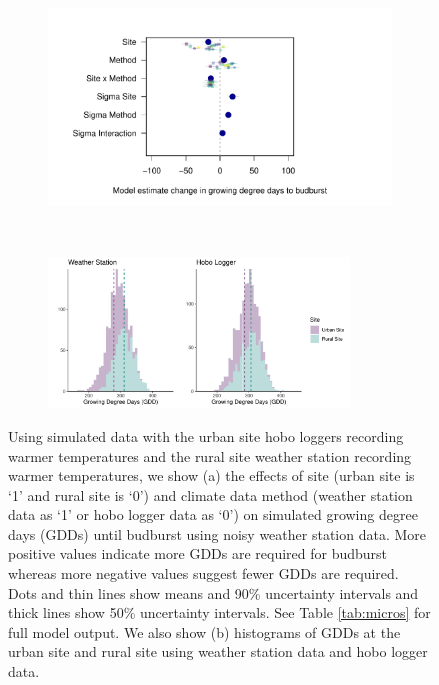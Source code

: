 \documentclass{article}\usepackage[]{graphicx}\usepackage[]{color}
\begin{document}
\begin{figure}[H]
  \begin{subfigure}{.5\linewidth}
    \caption{}
      \centering
      \includegraphics[height=7cm, width=11cm]{..//analyses/figures/muplot_urbws.pdf}
      \label{fig:muploturbanws}
  \end{subfigure}%
    \begin{subfigure}{.5\linewidth}
      \caption{}
      \centering
      \includegraphics[height=4cm, width=8cm]{..//analyses/figures/gdd_methods_urbanws.pdf}
    \label{fig:gddurbanws}
  \end{subfigure}
\caption{ Using simulated data with the urban site hobo loggers recording warmer temperatures and the rural site weather station recording warmer temperatures, we show (a) the effects of site (urban site is `1' and rural site is `0') and climate data method (weather station data as `1' or hobo logger data as `0') on simulated growing degree days (GDDs) until budburst using noisy weather station data. More positive values indicate more GDDs are required for budburst whereas more negative values suggest fewer GDDs are required. Dots and thin lines show means and 90\% uncertainty intervals and thick lines show 50\% uncertainty intervals. See Table \ref{tab:micros} for full model output. We also show (b) histograms of GDDs at the urban site and rural site using weather station data and hobo logger data. }
\label{fig:urbanws}
\end{figure}
\end{document}
